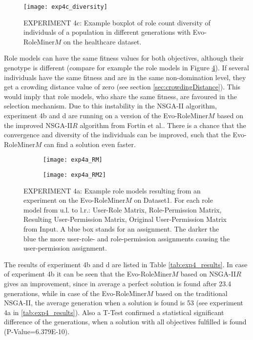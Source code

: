 \begin{figure}[H]
	\centering
	\texttt{[image: exp4c\_diversity]}
	\caption{EXPERIMENT 4c: Example boxplot of role count diversity of individuals of a population in different generations with Evo-RoleMiner$M$ on the healthcare dataset.}
	\label{fig:exp4c_diversity}
\end{figure}

Role models can have the same fitness values for both objectives, although their genotype is different (compare for example the role models in Figure \ref{fig:exp4a_RM_compare}). If several individuals have the same fitness and are in the same non-domination level, they get a crowding distance value of zero (see section \ref{sec:crowdingDistance}). This would imply that role models, who share the same fitness, are favoured in the selection mechanism. Due to this instability in the NSGA-II algorithm, experiment 4b and d are running on a version of the Evo-RoleMiner$M$ based on the improved NSGA-II$R$ algorithm from Fortin et al.\cite{Fortin:2013}. There is a chance that the convergence and diversity of the individuals can be improved, such that the Evo-RoleMiner$M$ can find a solution even faster.

\begin{figure}[H]
	\centering
	\begin{subfigure}[b]{0.5\textwidth}
		\texttt{[image: exp4a\_RM]}
		\caption{}
		\label{fig:exp4a_RM}
	\end{subfigure}%
	\begin{subfigure}[b]{0.5\textwidth}
		\texttt{[image: exp4a\_RM2]}
		\caption{}
		\label{fig:exp4a_RM2}
	\end{subfigure}
	\caption{EXPERIMENT 4a: Example role models resulting from an experiment on the Evo-RoleMiner$M$ on Dataset1. For each role model from u.l. to l.r.: User-Role Matrix, Role-Permission Matrix, Resulting User-Permission Matrix, Original User-Permission Matrix from Input. A blue box stands for an assignment. The darker the blue the more user-role- and role-permission assignments causing the user-permission assignment.}
	\label{fig:exp4a_RM_compare}
\end{figure}

The results of experiment 4b and d are listed in Table \ref{tab:exp4_results}. In case of experiment 4b it can be seen that the Evo-RoleMiner$M$ based on NSGA-II$R$ gives an improvement, since in average a perfect solution is found after 23.4 generations, while in case of the Evo-RoleMiner$M$ based on the traditional NSGA-II, the average generation when a solution is found is 53 (see experiment 4a in \ref{tab:exp4_results}). Also a T-Test confirmed a statistical significant difference of the generations, when a solution with all objectives fulfilled is found (P-Value=6.379E-10).

